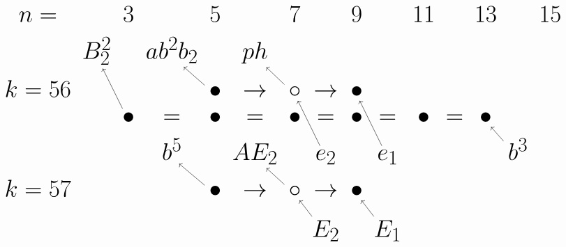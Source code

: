 \documentclass{article}
\begin{document}
\(
\begin{tikzcd}[nodes={font=\Huge},row sep=0.3cm,column sep=0.1cm]
n= & & 3 & & 5 & & 7 & & 9 & & 11 & & 13 & & 15 &  \\
 & B_2^2 && ab^2b_2 && ph  \\
k=56 && && \bullet \arrow[lu] & \rightarrow & \circ \arrow[lu] & \rightarrow & \bullet \\
&& \bullet\arrow[luu] & = & \bullet & = & \bullet & = & \bullet & = & \bullet & = & \bullet &  \\
& && b^5 && AE_2 && e_2\arrow[luu] && e_1\arrow[luu] && && b^3\arrow[lu] \\
k=57 && && \bullet \arrow[lu] & \rightarrow & \circ\arrow[lu] & \rightarrow & \bullet \\
\\
& && && && E_2\arrow[luu] && E_1\arrow[luu] \\
\end{tikzcd}
\)
\end{document}
